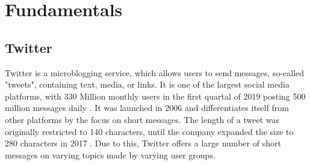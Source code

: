 \chapter{Fundamentals}
\label{cha:Chapter3_Fundamentals}

\section{Twitter}
Twitter is a microblogging service, which allows users to send messages, so-called "tweets", containing text, media, or links. It is one of the largest social media platforms, with 330 Million monthly users in the first quartal of 2019 posting 500 million messages daily \cite{twitter:users}. It was launched in 2006 and differentiates itself from other platforms by the focus on short messages. The length of a tweet was originally restricted to 140 characters, until the company expanded the size to 280 characters in 2017 \cite{twitter:characters}. Due to this, Twitter offers a large number of short messages on varying topics made by varying user groups. 

